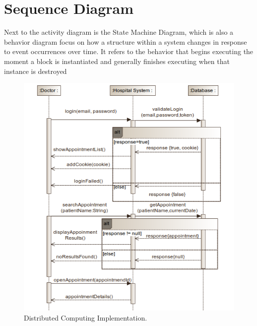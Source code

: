 \documentclass{article}
\begin{document}
            \section{Sequence Diagram}
            Next to the activity diagram is the State Machine Diagram, which is also a behavior
            diagram focus on how a structure within a system changes in response to event
            occurrences over time. It refers to the behavior that begins executing the moment a block
            is instantiated and generally finishes executing when that instance is destroyed
            \begin{figure}[H]
                \centering 
                \includegraphics[width=1\linewidth]{./img/seq1.png}
                \caption{Distributed Computing Implementation.}
                \label{fig:architecture}
            \end{figure}
\end{document}

